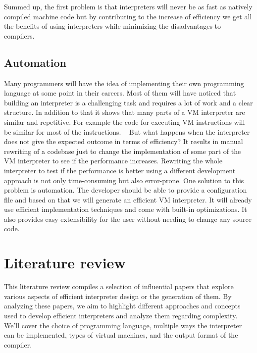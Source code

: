 \documentclass{article}
\begin{document}
Summed up, the first problem is that interpreters will never be as fast as
natively compiled machine code but by contributing to the increase of efficiency
we get all the benefits of using interpreters while minimizing the
disadvantages to compilers.

\subsection{Automation}
Many programmers will have the idea of implementing their own programming
language at some point in their careers. Most of them will have noticed that
building an interpreter is a challenging task and requires a lot of work and a
clear structure. In addition to that it shows that many parts of a VM
interpreter are similar and repetitive. For example the code for executing VM
instructions will be similar for most of the instructions. ~\cite{vmgen}
But what happens when the interpreter does not give the expected outcome in
terms of efficiency? It results in manual rewriting of a codebase just to
change the implementation of some part of the VM interpreter to see if the
performance increases. Rewriting the whole interpreter to test if the
performance is better using a different development approach is not only
time-consuming but also error-prone.
One solution to this problem is automation. The developer should be able to
provide a configuration file and based on that we will generate an efficient VM
interpreter. It will already use efficient implementation techniques and come
with built-in optimizations. It also provides easy extensibility for the user
without needing to change any source code.

\section{Literature review}
This literature review compiles a selection of influential papers that explore
various aspects of efficient interpreter design or the generation of them. By
analyzing these papers, we aim to highlight different approaches and concepts
used to develop efficient interpreters and analyze them regarding complexity.
We'll cover the choice of programming language, multiple ways the interpreter
can be implemented, types of virtual machines, and the output format of the
compiler.
\end{document}
